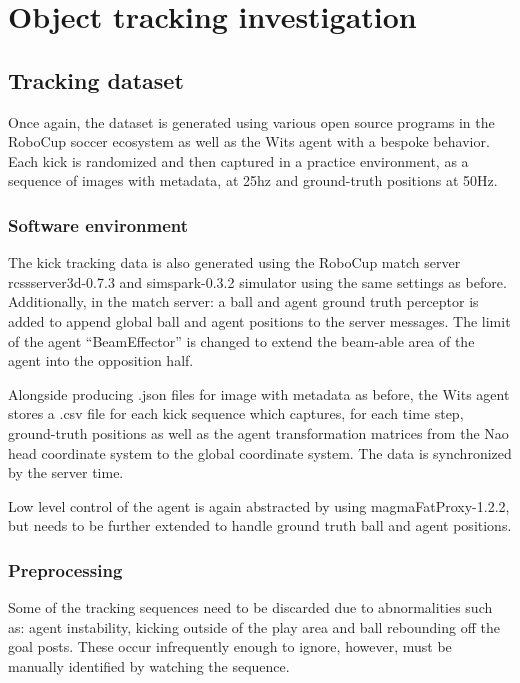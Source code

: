 \documentclass[a4paper,twoside,12pt]{report}
\begin{document}
\chapter{Object tracking investigation}

\section{Tracking dataset}
Once again, the dataset is generated using various open source programs in the RoboCup soccer ecosystem as well as the Wits agent with a bespoke behavior. Each kick is randomized and then captured in a practice environment, as a sequence of images with metadata, at 25hz and ground-truth positions at 50Hz.

\subsection{Software environment}
The kick tracking data is also generated using the RoboCup match server rcssserver3d-0.7.3 and simspark-0.3.2 simulator using the same settings as before. Additionally, in the match server: a ball and agent ground truth perceptor is added to append global ball and agent positions to the server messages. The limit of the agent ``BeamEffector'' is changed to extend the beam-able area of the agent into the opposition half.

Alongside producing .json files for image with metadata as before, the Wits agent stores a .csv file for each kick sequence which captures, for each time step, ground-truth positions as well as the agent transformation matrices from the Nao head coordinate system to the global coordinate system. The data is synchronized by the server time. 

Low level control of the agent is again abstracted by using magmaFatProxy-1.2.2, but needs to be further extended to handle ground truth ball and agent positions. 

\subsection{Preprocessing}

Some of the tracking sequences need to be discarded due to abnormalities such as: agent instability, kicking outside of the play area and ball rebounding off the goal posts. These occur infrequently enough to ignore, however, must be manually identified by watching the sequence. 
\end{document}
